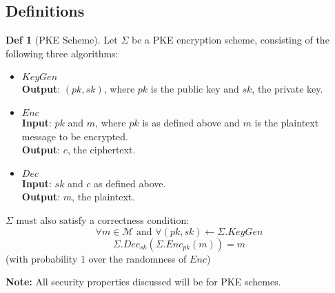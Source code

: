\documentclass[a4paper, 10pt]{article}
\theoremstyle{definition}
\newtheorem{definition}{Def}[section]
\begin{document}
\subsection{Definitions}

\begin{definition}[\ac{PKE} Scheme]
    Let $\Sigma$ be a \ac{PKE} encryption scheme, consisting of the following three algorithms:
    \begin{itemize}
        \item $KeyGen$\\ \textbf{Output}: $(pk, sk)$, where $pk$ is the public key and $sk$, the private key.
        \item $Enc$\\ \textbf{Input}: $pk$ and $m$, where $pk$ is as defined above and $m$ is the plaintext message to be encrypted. \\
        \textbf{Output}: $c$, the ciphertext.
        \item $Dec$\\ \textbf{Input}: $sk$ and $c$ as defined above.\\
        \textbf{Output}: $m$, the plaintext.
    \end{itemize}
    $\Sigma$ must also satisfy a correctness condition:
    \[\forall m \in \mathcal{M} \text{ and } \forall (pk, sk) \leftarrow \Sigma .KeyGen\]
    \[\Sigma .Dec_{sk}(\Sigma .Enc_{pk}(m)) = m\]
    (with probability 1 over the randomness of $Enc$)
\end{definition}

\textbf{Note:} All security properties discussed will be for \ac{PKE} schemes.
\end{document}
